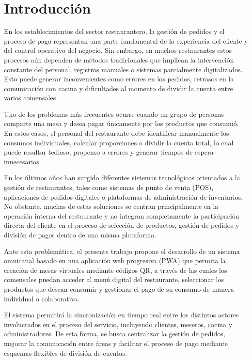 \documentclass[12pt]{report}
\begin{document}
\newpage
\chapter{Introducción}

En los establecimientos del sector restaurantero, la gestión de pedidos y el proceso de pago representan una parte fundamental de la experiencia del cliente y del control operativo del negocio. Sin embargo, en muchos restaurantes estos procesos aún dependen de métodos tradicionales que implican la intervención constante del personal, registros manuales o sistemas parcialmente digitalizados. Esto puede generar inconvenientes como errores en los pedidos, retrasos en la comunicación con cocina y dificultades al momento de dividir la cuenta entre varios comensales.

Uno de los problemas más frecuentes ocurre cuando un grupo de personas comparte una mesa y desea pagar únicamente por los productos que consumió. En estos casos, el personal del restaurante debe identificar manualmente los consumos individuales, calcular proporciones o dividir la cuenta total, lo cual puede resultar tedioso, propenso a errores y generar tiempos de espera innecesarios.

En los últimos años han surgido diferentes sistemas tecnológicos orientados a la gestión de restaurantes, tales como sistemas de punto de venta (POS), aplicaciones de pedidos digitales o plataformas de administración de inventarios. No obstante, muchas de estas soluciones se centran principalmente en la operación interna del restaurante y no integran completamente la participación directa del cliente en el proceso de selección de productos, gestión de pedidos y división de pagos dentro de una misma plataforma.

Ante esta problemática, el presente trabajo propone el desarrollo de un sistema omnicanal basado en una aplicación web progresiva (PWA) que permita la creación de mesas virtuales mediante códigos QR, a través de las cuales los comensales puedan acceder al menú digital del restaurante, seleccionar los productos que desean consumir y gestionar el pago de su consumo de manera individual o colaborativa.

El sistema permitirá la sincronización en tiempo real entre los distintos actores involucrados en el proceso del servicio, incluyendo clientes, meseros, cocina y administradores. De esta forma, se busca centralizar la gestión de pedidos, mejorar la comunicación entre áreas y facilitar el proceso de pago mediante esquemas flexibles de división de cuentas.
\end{document}

